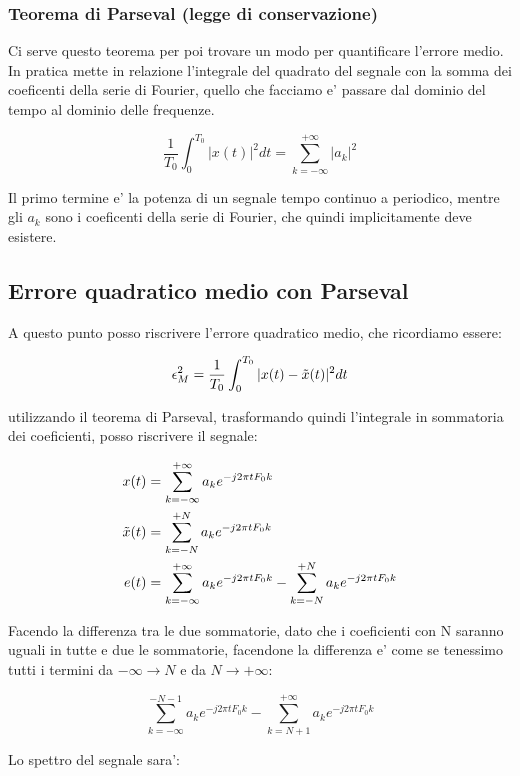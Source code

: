 \subsubsection{Teorema di Parseval (legge di conservazione)}
Ci serve questo teorema per poi trovare un modo per quantificare l'errore medio.
In pratica mette in relazione l'integrale del quadrato del segnale con la somma dei coeficenti della serie di Fourier, quello che facciamo e' passare dal dominio del tempo al dominio delle frequenze.

\begin{equation}
    \frac{1}{T_0} \int_0^{T_0} |x(t)|^2 dt = \sum_{k = - \infty}^{+ \infty} |a_k|^2
\end{equation}

Il primo termine e' la potenza di un segnale tempo continuo a periodico, mentre gli $a_k$ sono i coeficenti della serie di Fourier, che quindi implicitamente deve esistere.

\subsection{Errore quadratico medio con Parseval}

A questo punto posso riscrivere l'errore quadratico medio, che ricordiamo essere:

\[
    \epsilon_M^2 = \frac{1}{T_0} \int_0^{T_0} |x(t) - \Tilde{x}(t)|^2 dt
\]

utilizzando il teorema di Parseval, trasformando quindi l'integrale in sommatoria dei coeficienti, posso riscrivere il segnale:

\[\begin{split}
    x(t) &= \sum_{k = - \infty}^{+ \infty} a_k e^{-j2 \pi t F_0 k} \\
    \Tilde{x}(t) &= \sum_{k = -N}^{+ N} a_k e^{-j2 \pi t F_0 k} \\
    e(t) &= \sum_{k = - \infty}^{+ \infty} a_k e^{-j2 \pi t F_0 k} - \sum_{k = -N}^{+ N} a_k e^{-j2 \pi t F_0 k}
\end{split}\]

Facendo la differenza tra le due sommatorie, dato che i coeficienti con N saranno uguali in tutte e due le sommatorie, facendone la differenza e' come se tenessimo tutti i termini da $-\infty \rightarrow N$ e da $N \rightarrow +\infty$:

\[
    \sum_{k = - \infty}^{-N -1} a_k e^{-j2 \pi t F_0 k} - \sum_{k = N+1}^{+ \infty} a_k e^{-j2 \pi t F_0 k}
\]

Lo spettro del segnale sara':

